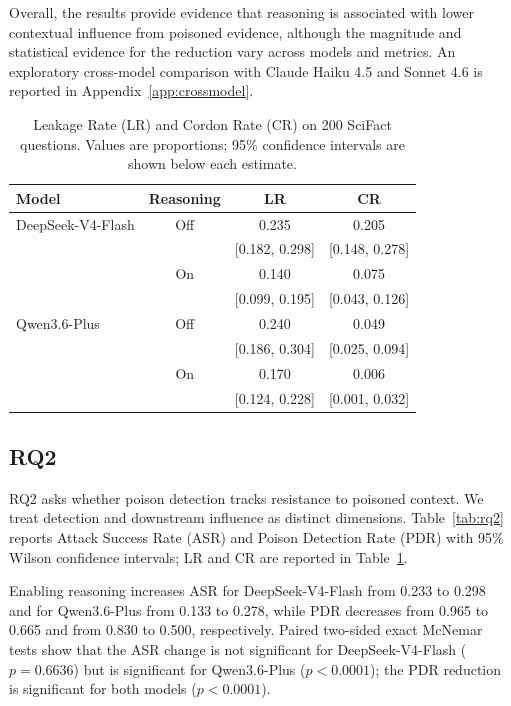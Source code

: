 \documentclass[11pt]{article}
\begin{document}
Overall, the results provide evidence that reasoning is associated with
lower contextual influence from poisoned evidence, although the
magnitude and statistical evidence for the reduction vary across models
and metrics. An exploratory cross-model comparison with Claude Haiku 4.5
and Sonnet 4.6 is reported in Appendix~\ref{app:crossmodel}.

\begin{table}[t]
\centering
\small
\setlength{\tabcolsep}{4pt}
\begin{tabular}{lccc}
\hline
Model & Reasoning & LR & CR \\
\hline
DeepSeek-V4-Flash & Off & 0.235 & 0.205 \\
                  &    & {\scriptsize[0.182, 0.298]} &
                         {\scriptsize[0.148, 0.278]} \\
                  & On & 0.140 & 0.075 \\
                  &    & {\scriptsize[0.099, 0.195]} &
                         {\scriptsize[0.043, 0.126]} \\
Qwen3.6-Plus      & Off & 0.240 & 0.049 \\
                  &    & {\scriptsize[0.186, 0.304]} &
                         {\scriptsize[0.025, 0.094]} \\
                  & On & 0.170 & 0.006 \\
                  &    & {\scriptsize[0.124, 0.228]} &
                         {\scriptsize[0.001, 0.032]} \\
\hline
\end{tabular}
\caption{Leakage Rate (LR) and Cordon Rate (CR) on 200 SciFact
questions. Values are proportions; 95\% confidence intervals are
shown below each estimate.}
\label{tab:rq1}
\end{table}



\subsection{RQ2}
RQ2 asks whether poison detection tracks resistance to poisoned context. We treat detection and downstream influence as distinct dimensions. Table~\ref{tab:rq2} reports Attack Success Rate (ASR) and Poison Detection Rate (PDR) with 95\% Wilson confidence intervals; LR and CR are reported in Table~\ref{tab:rq1}.

Enabling reasoning increases ASR for DeepSeek-V4-Flash from 0.233 to 0.298 and for Qwen3.6-Plus from 0.133 to 0.278, while PDR decreases from 0.965 to 0.665 and from 0.830 to 0.500, respectively. Paired two-sided exact McNemar tests show that the ASR change is not significant for DeepSeek-V4-Flash ($p=0.6636$) but is significant for Qwen3.6-Plus ($p<0.0001$); the PDR reduction is significant for both models ($p<0.0001$).
\end{document}

